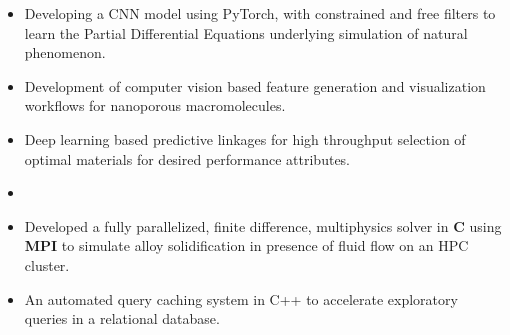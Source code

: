 \documentclass[10pt,a4paper]{altacv}
\begin{document}
\begin{itemize}
\item Developing a CNN model using PyTorch, with constrained and
free filters to learn the Partial Differential Equations underlying simulation
of natural phenomenon.
\end{itemize}
\divider

\begin{itemize}
\item Development of computer vision based feature generation and visualization workflows for nanoporous
macromolecules.
\item Deep learning based predictive linkages for high throughput selection of optimal materials for
desired performance attributes.
\end{itemize}
\divider

\begin{itemize}
\item {}
\item Developed a fully parallelized, finite difference, multiphysics solver
in \textbf{C} using \textbf{MPI} to simulate alloy solidification in presence
of fluid flow on an HPC cluster.
\end{itemize}
\divider

\begin{itemize}
\item An automated query caching system in C++ to accelerate
exploratory queries in a relational database.
\end{itemize}

%

%

\clearpage
\end{document}
